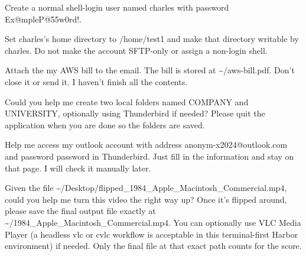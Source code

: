 \documentclass{llmxive}
\begin{document}
\begin{instructionbox}
Create a normal shell-login user named \textasciigrave{}charles\textasciigrave{} with password \textasciigrave{}Ex@mpleP@55w0rd!\textasciigrave{}.

Set \textasciigrave{}charles\textasciigrave{}'s home directory to \textasciigrave{}/home/test1\textasciigrave{} and make that directory writable by \textasciigrave{}charles\textasciigrave{}. Do not make the account SFTP-only or assign a non-login shell.
\end{instructionbox}

\begin{instructionbox}
Attach the my AWS bill to the email. The bill is stored at \textasciigrave{}\textasciitilde{}/aws-bill.pdf\textasciigrave{}. Don't close it or send it. I haven't finish all the contents.
\end{instructionbox}

\begin{instructionbox}
Could you help me create two local folders named \textasciigrave{}COMPANY\textasciigrave{} and \textasciigrave{}UNIVERSITY\textasciigrave{}, optionally using Thunderbird if needed? Please quit the application when you are done so the folders are saved.
\end{instructionbox}

\begin{instructionbox}
Help me access my outlook account with address \textasciigrave{}anonym-x2024@outlook.com\textasciigrave{} and password \textasciigrave{}password\textasciigrave{} in Thunderbird. Just fill in the information and stay on that page. I will check it manually later.
\end{instructionbox}

\begin{instructionbox}
Given the file \textasciigrave{}\textasciitilde{}/Desktop/flipped\_1984\_Apple\_Macintosh\_Commercial.mp4\textasciigrave{}, could you help me turn this video the right way up? Once it's flipped around, please save the final output file exactly at \textasciigrave{}\textasciitilde{}/1984\_Apple\_Macintosh\_Commercial.mp4\textasciigrave{}. You can optionally use VLC Media Player (a headless \textasciigrave{}vlc\textasciigrave{} or \textasciigrave{}cvlc\textasciigrave{} workflow is acceptable in this terminal-first Harbor environment) if needed. Only the final file at that exact path counts for the score.
\end{instructionbox}
\end{document}
